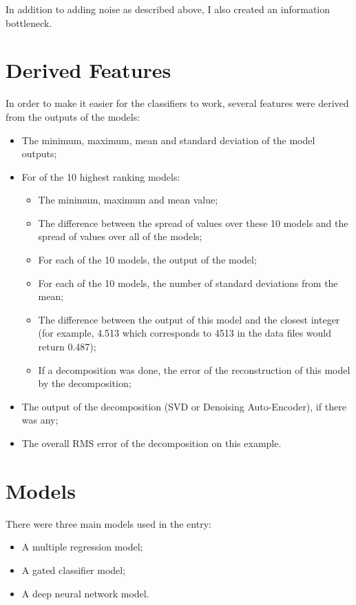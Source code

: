 \documentclass{article}
\begin{document}
In addition to adding noise as described above, I also created an information bottleneck.

\section{Derived Features}

In order to make it easier for the classifiers to work, several features were derived from the outputs of the models:

\begin{itemize}
\item The minimum, maximum, mean and standard deviation of the model outputs;
\item For of the 10 highest ranking models:
  \begin{itemize}
    \item The minimum, maximum and mean value;
    \item The difference between the spread of values over these 10 models and the spread of values over all of the models;
    \item For each of the 10 models, the output of the model;
    \item For each of the 10 models, the number of standard deviations from the mean;
    \item The difference between the output of this model and the closest integer (for example, 4.513 which corresponds to 4513 in the data files would return 0.487);
    \item If a decomposition was done, the error of the reconstruction of this model by the decomposition;
  \end{itemize}
\item The output of the decomposition (SVD or Denoising Auto-Encoder), if there was any;
\item The overall RMS error of the decomposition on this example.

\end{itemize}


\section{Models}

There were three main models used in the entry:

\begin{itemize}
\item A multiple regression model;
\item A gated classifier model;
\item A deep neural network model.
\end{itemize}
\end{document}

